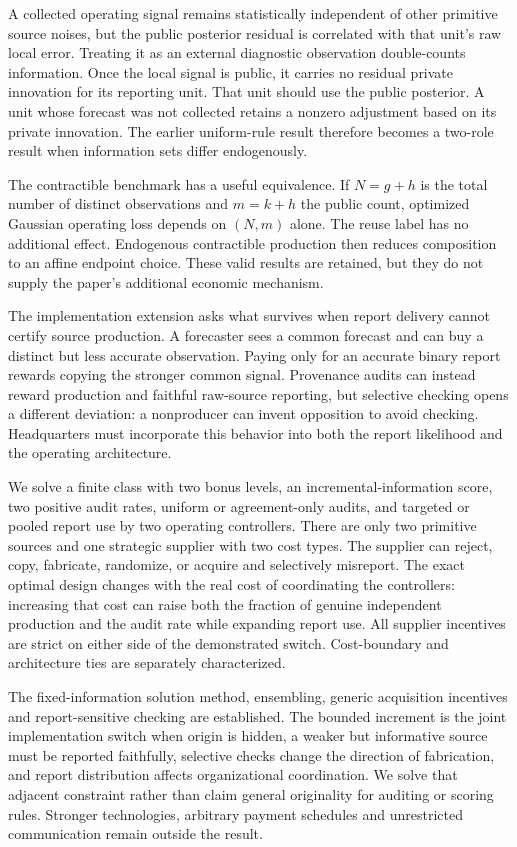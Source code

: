 \documentclass[
  11pt,
]{article}
\begin{document}
A collected operating signal remains statistically independent of other
primitive source noises, but the public posterior residual is correlated
with that unit's raw local error. Treating it as an external diagnostic
observation double-counts information. Once the local signal is public,
it carries no residual private innovation for its reporting unit. That
unit should use the public posterior. A unit whose forecast was not
collected retains a nonzero adjustment based on its private innovation.
The earlier uniform-rule result therefore becomes a two-role result when
information sets differ endogenously.

The contractible benchmark has a useful equivalence. If \(N=g+h\) is the
total number of distinct observations and \(m=k+h\) the public count,
optimized Gaussian operating loss depends on \((N,m)\) alone. The reuse
label has no additional effect. Endogenous contractible production then
reduces composition to an affine endpoint choice. These valid results
are retained, but they do not supply the paper's additional economic
mechanism.

The implementation extension asks what survives when report delivery
cannot certify source production. A forecaster sees a common forecast
and can buy a distinct but less accurate observation. Paying only for an
accurate binary report rewards copying the stronger common signal.
Provenance audits can instead reward production and faithful raw-source
reporting, but selective checking opens a different deviation: a
nonproducer can invent opposition to avoid checking. Headquarters must
incorporate this behavior into both the report likelihood and the
operating architecture.

We solve a finite class with two bonus levels, an
incremental-information score, two positive audit rates, uniform or
agreement-only audits, and targeted or pooled report use by two
operating controllers. There are only two primitive sources and one
strategic supplier with two cost types. The supplier can reject, copy,
fabricate, randomize, or acquire and selectively misreport. The exact
optimal design changes with the real cost of coordinating the
controllers: increasing that cost can raise both the fraction of genuine
independent production and the audit rate while expanding report use.
All supplier incentives are strict on either side of the demonstrated
switch. Cost-boundary and architecture ties are separately
characterized.

The fixed-information solution method, ensembling, generic acquisition
incentives and report-sensitive checking are established. The bounded
increment is the joint implementation switch when origin is hidden, a
weaker but informative source must be reported faithfully, selective
checks change the direction of fabrication, and report distribution
affects organizational coordination. We solve that adjacent constraint
rather than claim general originality for auditing or scoring rules.
Stronger technologies, arbitrary payment schedules and unrestricted
communication remain outside the result.
\end{document}
